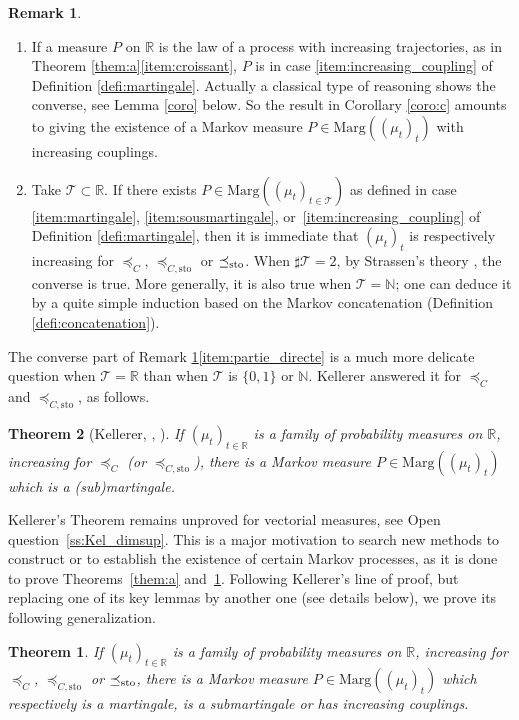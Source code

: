 \documentclass[11pt]{article}
\newcommand{\skpt}{\smallskip}
\theoremstyle{plain}
\newtheorem{themBJ}{Theorem}
\newtheorem{them}{Theorem}[section]
\theoremstyle{definition}
\newtheorem{rem}[them]{Remark}
\newcommand{\Tt}{{\mathcal T}}
\newcommand{\ma}{\mathrm{Marg}}
\newcommand{\R}{\mathbb{R}}
\newcommand{\N}{\mathbb{N}}
\newcommand{\sto}{\mathrm{sto}}
\newcommand{\leqc}{\preceq_{C}}
\newcommand{\leqcs}{\preceq_{C,\sto}}
\newcommand{\leqs}{\preceq_{\text{\rm sto}}}
\begin{document}
\skpt
\begin{rem}\label{rem:martingale}
\begin{enumerate}
\item
\label{item:traj_croiss} If a measure $P$ on $\R$ is the law of a process with increasing trajectories, as in Theorem \ref{them:a}\eqref{item:croissant}, $P$ is in case \eqref{item:increasing_coupling} of Definition \ref{defi:martingale}. Actually a classical type of reasoning shows the converse, see Lemma \ref{coro} below. So the result in Corollary \ref{coro:c} amounts to giving the existence of a Markov measure $P\in\ma((\mu_t)_t)$ with increasing couplings.

\item
\label{item:partie_directe} Take $\Tt\subset\R$. If there exists $P\in\ma((\mu_t)_{t\in\Tt})$ as defined in case \eqref{item:martingale}, \eqref{item:sousmartingale}, or~\eqref{item:increasing_coupling} of Definition \ref{defi:martingale}, then it is immediate that $(\mu_t)_t$ is respectively increasing for $\leqc$, $\leqcs$ or $\leqs$. When $\sharp\Tt=2$, by Strassen's theory \cite{St65}, the converse is true. More generally, it is also true when $\Tt=\N$; one can deduce it by a quite simple induction based on the Markov concatenation (Definition \ref{defi:concatenation}).
\end{enumerate}
\end{rem}

The converse part of Remark \ref{rem:martingale}\eqref{item:partie_directe} is a much more delicate question when $\Tt=\R$ than when $\Tt$ is $\{0,1\}$ or $\N$. Kellerer answered it for $\leqc$ and $\leqcs$, as follows.

\begin{them}[Kellerer, {\cite[Th.\,3]{Ke72}, \cite{Ke73}}]\label{them:kellerer_intro} If $(\mu_t)_{t\in \R}$ is a family of probability measures on\/ $\R$, increasing for $\leqc$ (or $\leqcs$), there is a Markov measure $P\in\ma((\mu_t)_t)$ which is a (sub)martingale.
\end{them}

Kellerer's Theorem remains unproved for vectorial measures, see Open question~\ref{ss:Kel_dimsup}. This is a major motivation to search new methods to construct or to establish the existence of certain Markov processes, as it is done to prove Theorems~\ref{them:a} and~\ref{them:c}. Following Kellerer's line of proof, but replacing one of its key lemmas by another one (see details below), we prove its following generalization.
\begin{themBJ}\label{them:c}If $(\mu_t)_{t\in \R}$ is a family of probability measures on\/ $\R$, increasing for $\leqc$, $\leqcs$ or $\leqs$, there is a Markov measure $P\in\ma((\mu_t)_t)$ which respectively is a martingale, is a submartingale or has increasing couplings.
\end{themBJ}
\end{document}
